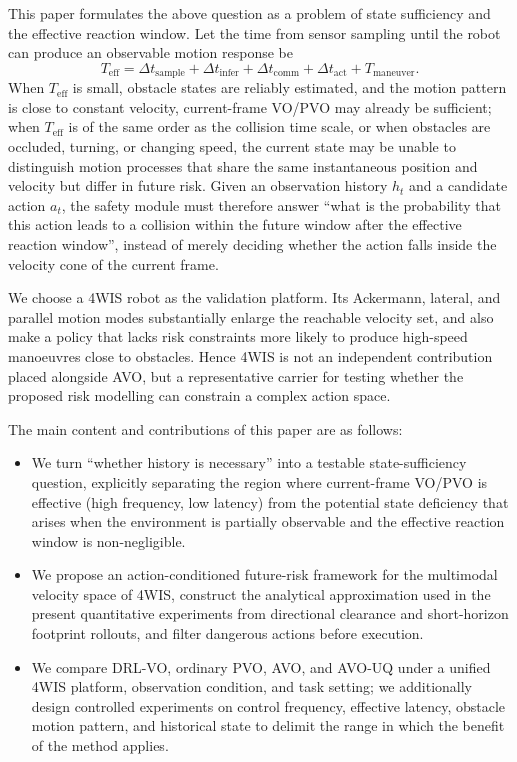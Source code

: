 \documentclass[10pt,a4paper,twocolumn]{article}
\begin{document}
This paper formulates the above question as a problem of state sufficiency and the effective reaction window. Let the time from sensor sampling until the robot can produce an observable motion response be
\begin{equation}
    T_{\mathrm{eff}}=\Delta t_{\mathrm{sample}}+\Delta t_{\mathrm{infer}}+\Delta t_{\mathrm{comm}}+\Delta t_{\mathrm{act}}+T_{\mathrm{maneuver}}.
    \label{eq:effective_window}
\end{equation}
When $T_{\mathrm{eff}}$ is small, obstacle states are reliably estimated, and the motion pattern is close to constant velocity, current-frame VO/PVO may already be sufficient; when $T_{\mathrm{eff}}$ is of the same order as the collision time scale, or when obstacles are occluded, turning, or changing speed, the current state may be unable to distinguish motion processes that share the same instantaneous position and velocity but differ in future risk. Given an observation history $h_t$ and a candidate action $a_t$, the safety module must therefore answer ``what is the probability that this action leads to a collision within the future window after the effective reaction window'', instead of merely deciding whether the action falls inside the velocity cone of the current frame.

We choose a 4WIS robot as the validation platform. Its Ackermann, lateral, and parallel motion modes substantially enlarge the reachable velocity set, and also make a policy that lacks risk constraints more likely to produce high-speed manoeuvres close to obstacles. Hence 4WIS is not an independent contribution placed alongside AVO, but a representative carrier for testing whether the proposed risk modelling can constrain a complex action space.

The main content and contributions of this paper are as follows:
\begin{itemize}
    \item We turn ``whether history is necessary'' into a testable state-sufficiency question, explicitly separating the region where current-frame VO/PVO is effective (high frequency, low latency) from the potential state deficiency that arises when the environment is partially observable and the effective reaction window is non-negligible.
    \item We propose an action-conditioned future-risk framework for the multimodal velocity space of 4WIS, construct the analytical approximation used in the present quantitative experiments from directional clearance and short-horizon footprint rollouts, and filter dangerous actions before execution.
    \item We compare DRL-VO, ordinary PVO, AVO, and AVO-UQ under a unified 4WIS platform, observation condition, and task setting; we additionally design controlled experiments on control frequency, effective latency, obstacle motion pattern, and historical state to delimit the range in which the benefit of the method applies.
\end{itemize}
\end{document}
